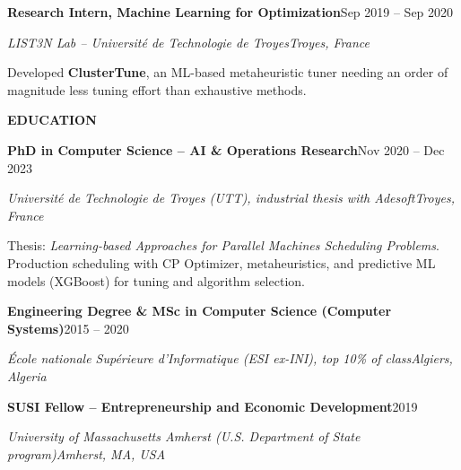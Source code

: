 \documentclass[10pt,letterpaper]{article}
\newcommand{\cvsection}[1]{%
  \vspace{7pt}%
  {\color{accent}\large\bfseries\MakeUppercase{#1}}\par
  \vspace{-4pt}{\color{accent}\rule{\linewidth}{0.6pt}}\par
  \vspace{2pt}}
\newcommand{\cvrole}[4]{%
  \vspace{4pt}%
  {\bfseries #1}\hfill #2\par
  {\itshape #3}\hfill {\itshape #4}\par
  \vspace{1pt}}
\newenvironment{cvitems}{%
  \begin{list}{\textbullet}{%
    \setlength{\leftmargin}{1.2em}\setlength{\labelwidth}{0.8em}%
    \setlength{\labelsep}{0.4em}\setlength{\itemsep}{1pt}%
    \setlength{\parsep}{0pt}\setlength{\topsep}{1pt}\setlength{\partopsep}{0pt}}%
  \small}{\end{list}}
\begin{document}
\cvrole{Research Intern, Machine Learning for Optimization}{Sep 2019 -- Sep 2020}
       {LIST3N Lab -- Universit\'e de Technologie de Troyes}{Troyes, France}
\begin{cvitems}
  \item Developed \textbf{ClusterTune}, an ML-based metaheuristic tuner needing an order of magnitude
    less tuning effort than exhaustive methods.
\end{cvitems}

\cvsection{Education}
{\small
{\bfseries PhD in Computer Science -- AI \& Operations Research}\hfill Nov 2020 -- Dec 2023\par
{\itshape Universit\'e de Technologie de Troyes (UTT), industrial thesis with Adesoft}\hfill{\itshape Troyes, France}\par
\vspace{1pt}
Thesis: \textit{Learning-based Approaches for Parallel Machines Scheduling Problems}. Production
scheduling with CP Optimizer, metaheuristics, and predictive ML models (XGBoost) for tuning and
algorithm selection.\par
\vspace{4pt}
{\bfseries Engineering Degree \& MSc in Computer Science (Computer Systems)}\hfill 2015 -- 2020\par
{\itshape \'Ecole nationale Sup\'erieure d'Informatique (ESI ex-INI), top 10\% of class}\hfill{\itshape Algiers, Algeria}\par
\vspace{4pt}
{\bfseries SUSI Fellow -- Entrepreneurship and Economic Development}\hfill 2019\par
{\itshape University of Massachusetts Amherst (U.S. Department of State program)}\hfill{\itshape Amherst, MA, USA}\par
}
\end{document}
